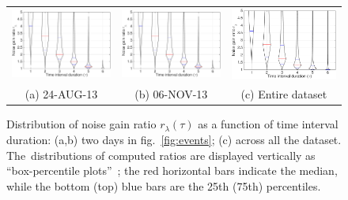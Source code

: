 \begin{figure}
    \footnotesize
    \centering
    \begin{tabular}{ccc}
    \setlength{\tabcolsep}{0pt}
    \includegraphics[width=.30\linewidth]{./figures/relativePerf/20130824-maxGain-global-relativePerf.pdf} & 
    \includegraphics[width=.30\linewidth]{./figures/relativePerf/20130824-maxGain-global-relativePerf.pdf} & 
    \includegraphics[width=.30\linewidth]{./figures/relativePerf/all-maxGain-relativePerf.pdf} \\
    (a) 24-AUG-13 & (b) 06-NOV-13 & (c) Entire dataset
    \end{tabular}
    \vspace{.15em}
    \caption[]{Distribution of noise gain ratio $r_\lambda(\tau)$ as a function of time interval duration: (a,b) two days in fig.~\ref{fig:events}; (c) across all the dataset. The~distributions of computed ratios are displayed vertically as ``box-percentile plots''~\cite{esty2003box}; the red horizontal bars indicate the median, while the bottom (top) blue bars are the 25th (75th) percentiles. }
    \label{fig:ratios}
\end{figure}


